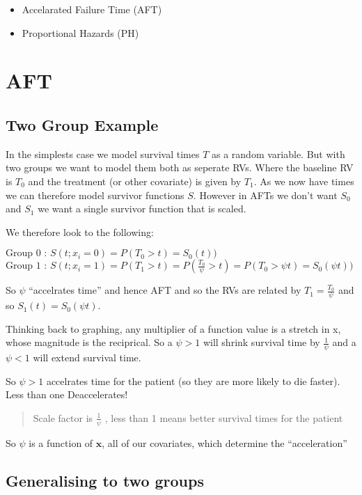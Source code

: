 \documentclass[
  letterpaper,
  DIV=11,
  numbers=noendperiod]{scrreprt}
\providecommand{\tightlist}{%
  \setlength{\itemsep}{0pt}\setlength{\parskip}{0pt}}\usepackage{longtable,booktabs,array}
\begin{document}
\begin{itemize}
\tightlist
\item
  Accelarated Failure Time (AFT)
\item
  Proportional Hazards (PH)
\end{itemize}

\hypertarget{aft}{%
\section{AFT}\label{aft}}

\hypertarget{two-group-example}{%
\subsection{Two Group Example}\label{two-group-example}}

In the simplests case we model survival times \(T\) as a random
variable. But with two groups we want to model them both as seperate
RVs. Where the baseline RV is \(T_0\) and the treatment (or other
covariate) is given by \(T_1\). As we now have times we can therefore
model survivor functions \(S\). However in AFTs we don't want \(S_0\)
and \(S_1\) we want a single survivor function that is scaled.

We therefore look to the following:

\(\text{Group 0 :   } S(t ; x_i=0) = P(T_0>t) = S_0(t))\)
\(\text{Group 1 :   } S(t ; x_i=1) = P(T_1>t) = P(\frac{T_0}{\psi}> t) = P(T_0>\psi t) = S_0(\psi t))\)

So \(\psi\) ``accelrates time'' and hence AFT and so the RVs are related
by \(T_1 = \frac{T_0}{\psi}\) and so \(S_1(t) = S_0(\psi t)\).

Thinking back to graphing, any multiplier of a function value is a
stretch in x, whose magnitude is the reciprical. So a \(\psi >1\) will
shrink survival time by \(\frac{1}{\psi}\) and a \(\psi <1\) will extend
survival time.

So \(\psi >1\) accelrates time for the patient (so they are more likely
to die faster). Less than one Deaccelerates!

\begin{quote}
Scale factor is \(\frac{1}{\psi}\) , less than 1 means better survival
times for the patient
\end{quote}

So \(\psi\) is a function of \(\textbf{x}\), all of our covariates,
which determine the ``acceleration''

\hypertarget{generalising-to-two-groups}{%
\subsection{Generalising to two
groups}\label{generalising-to-two-groups}}
\end{document}
